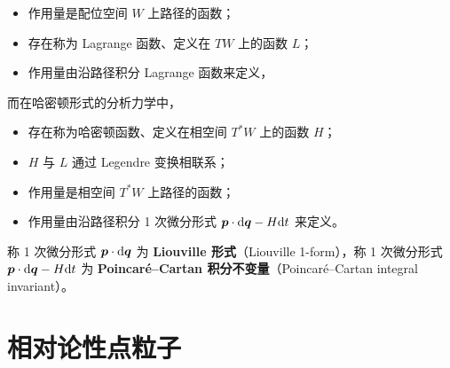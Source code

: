
\begin{itemize}[leftmargin=2em]
  \item 作用量是配位空间 $W$ 上路径的函数；
  \item 存在称为 Lagrange 函数、定义在 $TW$ 上的函数 $L$；
  \item 作用量由沿路径积分 Lagrange 函数来定义，
\end{itemize}
而在哈密顿形式的分析力学中，
\begin{itemize}[leftmargin=2em]
  \item 存在称为哈密顿函数、定义在相空间 $T^*W$ 上的函数 $H$；
  \item $H$ 与 $L$ 通过 Legendre 变换相联系；
  \item 作用量是相空间 $T^*W$ 上路径的函数；
  \item 作用量由沿路径积分 1 次微分形式 $\bm{p}\cdot\mathrm{d}\bm{q}-H\mathrm{d} t$ 来定义。
\end{itemize}

称 1 次微分形式 $\bm{p}\cdot\mathrm{d}\bm{q}$ 为 \textbf{Liouville 形式}（Liouville 1-form），称 1 次微分形式 $\bm{p}\cdot\mathrm{d}\bm{q}-H\mathrm{d} t$ 为 \textbf{Poincaré--Cartan 积分不变量}（Poincaré--Cartan integral invariant）。


\section{相对论性点粒子}

